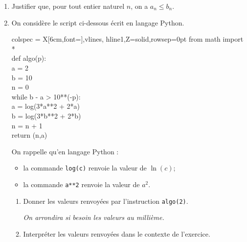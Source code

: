 \documentclass[10pt]{article}
\begin{document}
\begin{enumerate}
	\item Justifier que, pour tout entier naturel $n$, on a \quad $a_{n} \leqslant b_{n}$.

	\item On considère le script ci-dessous écrit en langage Python.

\begin{center}
	\begin{tblr}{colspec = {X[6cm,font=\ttfamily]},vlines, hline{1,Z}={solid},rowsep={0pt}}
	from math import *\\
	def algo(p):\\
	\quad a = 2\\
	\quad b = 10\\
	\quad n = 0\\
	\quad while b - a > 10**(-p):\\
	\quad \quad a = log(3*a**2 + 2*a)\\
	\quad \quad b = log(3*b**2 + 2*b)\\
	\quad \quad n = n + 1\\
	\quad return (n,a)\\
\end{tblr}
\end{center}

On rappelle qu'en langage Python :

	\begin{itemize}[label=\textbullet~]
		\item la commande \texttt{log(c)} renvoie la valeur de $\ln (c)$;

		\item la commande \texttt{a**2} renvoie la valeur de $a^{2}$.
	\end{itemize}

	\begin{enumerate}
		\item Donner les valeurs renvoyées par l'instruction \texttt{algo(2)}.

		\emph{On arrondira si besoin les valeurs au millième.}

		\item Interpréter les valeurs renvoyées dans le contexte de l'exercice.
	\end{enumerate}
\end{enumerate}
\end{document}
